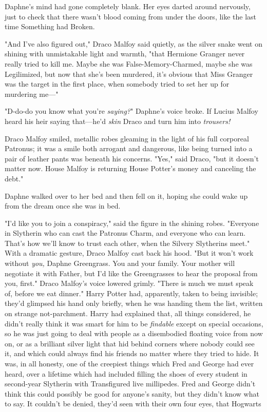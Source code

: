 Daphne's mind had gone completely blank. Her eyes darted around nervously, just
to check that there wasn't blood coming from under the doors, like the last
time Something had Broken.

"And I've also figured out," Draco Malfoy said quietly, as the silver snake
went on shining with unmistakable light and warmth, "that Hermione Granger
never really tried to kill me. Maybe she was False-Memory-Charmed, maybe she
was Legilimized, but now that she's been murdered, it's obvious that Miss
Granger was the target in the first place, when somebody tried to set her up
for murdering me\mbox{---}"

"D-do-do you know what you're \emph{saying?}" Daphne's voice broke. If Lucius
Malfoy heard his heir saying that---he'd \emph{skin} Draco and turn him into
\emph{trousers!}

Draco Malfoy smiled, metallic robes gleaming in the light of his full corporeal
Patronus; it was a smile both arrogant and dangerous, like being turned into a
pair of leather pants was beneath his concerns. "Yes," said Draco, "but it
doesn't matter now. House Malfoy is returning House Potter's money and
canceling the debt."

Daphne walked over to her bed and then fell on it, hoping she could wake up
from the dream once she was in bed.

"I'd like you to join a conspiracy," said the figure in the shining robes.
"Everyone in Slytherin who can cast the Patronus Charm, and everyone who can
learn. That's how we'll know to trust each other, when the Silvery Slytherins
meet." With a dramatic gesture, Draco Malfoy cast back his hood. "But it won't
work without \emph{you,} Daphne Greengrass. You and your family. Your mother
will negotiate it with Father, but I'd like the Greengrasses to hear the
proposal from you, first." Draco Malfoy's voice lowered grimly. "There is much
we must speak of, before we eat dinner."
\sbreak
Harry Potter had, apparently, taken to being invisible; they'd glimpsed his
hand only briefly, when he was handing them the list, written on strange
not-parchment. Harry had explained that, all things considered, he didn't
really think it was smart for him to be \emph{findable} except on special
occasions, so he was just going to deal with people as a disembodied floating
voice from now on, or as a brilliant silver light that hid behind corners where
nobody could see it, and which could always find his friends no matter where
they tried to hide. It was, in all honesty, one of the creepiest things which
Fred and George had ever heard, over a lifetime which had included filling the
shoes of every student in second-year Slytherin with Transfigured live
millipedes. Fred and George didn't think this could possibly be good for
anyone's sanity, but they didn't know what to say. It couldn't be denied,
they'd seen with their own four eyes, that Hogwarts{\el}

